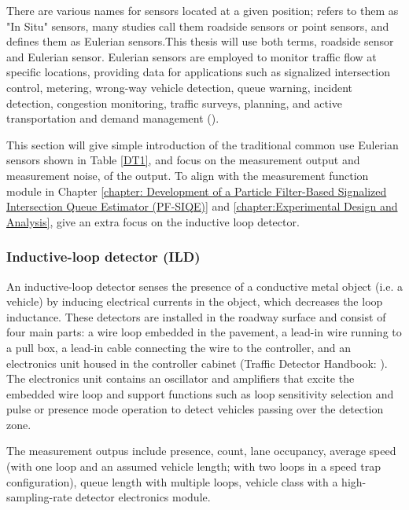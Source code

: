 There are various names for sensors located at a given position; \textcite{jain2019review} refers to them as "In Situ" sensors, many studies call them roadside sensors or point sensors, and \textcite{klein2024roadside} defines them as Eulerian sensors.This thesis will use both terms, roadside sensor and Eulerian sensor. Eulerian sensors are employed to monitor traffic flow at specific locations, providing data for applications such as signalized intersection control, metering, wrong-way vehicle detection, queue warning, incident detection, congestion monitoring, traffic surveys, planning, and active transportation and demand management (\textcite{klein2024roadside}).

This section will give simple introduction of the traditional common use Eulerian sensors shown in Table \ref{DT1}, and focus on the measurement output and measurement noise, of the output. To align with the measurement function module in Chapter \ref{chapter: Development of a Particle Filter-Based Signalized Intersection Queue Estimator (PF-SIQE)} and \ref{chapter:Experimental Design and Analysis}, give an extra focus on the inductive loop detector.

\subsubsection{Inductive-loop detector (ILD)}\label{Inductive-loop detector (ILD)}
An inductive-loop detector senses the presence of a conductive metal object (i.e. a vehicle) by inducing electrical currents in the object, which decreases the loop inductance. These detectors are installed in the roadway surface and consist of four main parts: a wire loop embedded in the pavement, a lead-in wire running to a pull box, a lead-in cable connecting the wire to the controller, and an electronics unit housed in the controller cabinet (Traffic Detector Handbook: \textcite{klein2006traffic}). The electronics unit contains an oscillator and amplifiers that excite the embedded wire loop and support functions such as loop sensitivity selection and pulse or presence mode operation to detect vehicles passing over the detection zone. 

The measurement outpus include presence, count, lane occupancy, average speed (with one loop and an assumed
vehicle length; with two loops in a speed trap configuration), queue length with multiple loops, vehicle class with a high-sampling-rate detector electronics module. 

